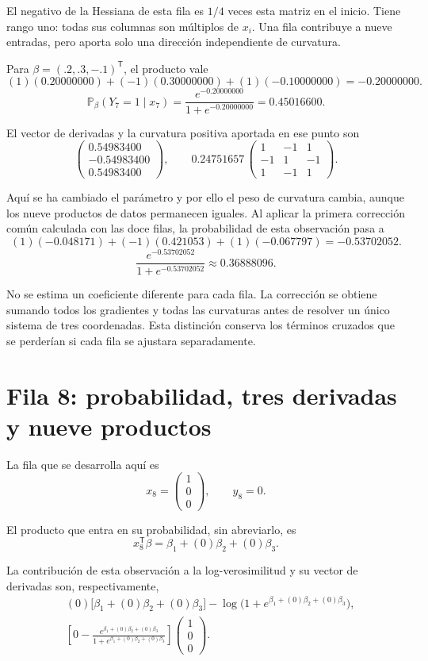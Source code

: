 \documentclass[11pt,a4paper]{article}
\newcommand{\Prob}{\mathbb P}
\newcommand{\T}{^{\mathsf T}}
\begin{document}
El negativo de la Hessiana de esta fila es \(1/4\)
veces esta matriz en el inicio. Tiene rango uno:
todas sus columnas son múltiplos de \(x_i\).
Una fila contribuye a nueve entradas, pero aporta
solo una dirección independiente de curvatura.

Para \(\beta=(.2,.3,-.1)\T\), el producto vale
\[
(1)(0.20000000)+(-1)(0.30000000)+(1)(-0.10000000)=-0.20000000.
\]
\[
\Prob_\beta(Y_{7}=1\mid x_{7})=\frac{e^{-0.20000000}}{1+e^{-0.20000000}}=0.45016600.
\]

El vector de derivadas y la curvatura positiva aportada
en ese punto son
\[
\begin{pmatrix}0.54983400\\-0.54983400\\0.54983400\end{pmatrix},\qquad 0.24751657\,\begin{pmatrix}1&-1&1\\-1&1&-1\\1&-1&1\end{pmatrix}.
\]

Aquí se ha cambiado el parámetro y por ello el peso de
curvatura cambia, aunque los nueve productos de datos
permanecen iguales.
Al aplicar la primera corrección común calculada con las doce filas,
la probabilidad de esta observación pasa a
\[
(1)(-0.048171)+(-1)(0.421053)+(1)(-0.067797)=-0.53702052.
\]
\[
\frac{e^{-0.53702052}}{1+e^{-0.53702052}}\approx0.36888096.
\]

No se estima un coeficiente diferente para cada fila.
La corrección se obtiene sumando todos los gradientes y todas
las curvaturas antes de resolver un único sistema de tres coordenadas.
Esta distinción conserva los términos cruzados que se perderían
si cada fila se ajustara separadamente.

\clearpage
\section{Fila 8: probabilidad, tres derivadas y nueve productos}\label{logit90}
La fila que se desarrolla aquí es
\[
x_{8}=\begin{pmatrix}1\\0\\0\end{pmatrix},\qquad y_{8}=0.
\]

El producto que entra en su probabilidad, sin abreviarlo, es
\[
x_{8}\T\beta=\beta_1+(0)\beta_2+(0)\beta_3.
\]

La contribución de esta observación a la log-verosimilitud
y su vector de derivadas son, respectivamente,
\[
\begin{aligned}
&(0)\bigl[\beta_1+(0)\beta_2+(0)\beta_3\bigr]-\log\bigl(1+e^{\beta_1+(0)\beta_2+(0)\beta_3}\bigr),\\&\left[0-\frac{e^{\beta_1+(0)\beta_2+(0)\beta_3}}{1+e^{\beta_1+(0)\beta_2+(0)\beta_3}}\right]\begin{pmatrix}1\\0\\0\end{pmatrix}.\end{aligned}
\]
\end{document}

